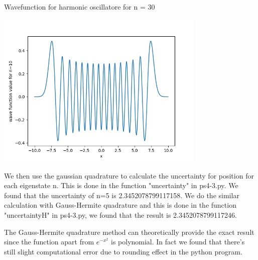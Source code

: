 \documentclass[letterpaper,12pt]{article}
\begin{document}
\begin{table}[!h]
    \centering
    \caption{Wavefunction for harmonic oscillatore for n = 30}
    \includegraphics[width=10cm]{ps4-3-2.png}
    \label{plot}%
\end{table}%
\newpage

We then use the gaussian quadrature to calculate the uncertainty for position for each eigenstate n. This is done in the function "uncertainty" in ps4-3.py. We found that the uncertainty of n=5 is 2.3452078799117158. We do the similar calculation with Gauss-Hermite quadrature and this is done in the function "uncertaintyH" in ps4-3.py, we found that the result is 2.3452078799117246.

The Gauss-Hermite quadrature method can theoretically provide the exact result since the function apart from $e^{-x^2}$ is polynomial. In fact we found that there's still slight computational error due to rounding effect in the python program. 
\end{document}
